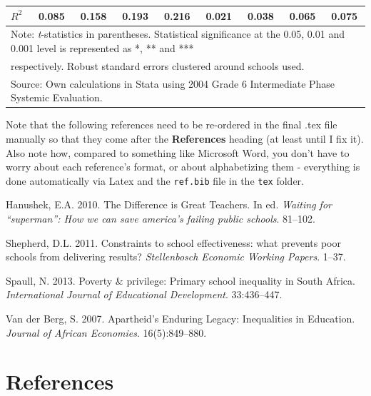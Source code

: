 \documentclass[12pt,preprint, authoryear]{article}
\numberwithin{equation}{section}
\numberwithin{figure}{section}
\numberwithin{table}{section}
\begin{document}
\begin{longtable}[htbp] {p{5cm}*{4}{c}|*{4}{c}}
\(R^{2}\)       &    0.085         &    0.158         &    0.193         &    0.216         &    0.021         &    0.038         &    0.065         &    0.075         \\
\hline\hline
\multicolumn{9}{l}{Note: \textit{t}-statistics in parentheses. Statistical significance at the 0.05, 0.01 and 0.001 level is represented as *, ** and ***} \\
\multicolumn{9}{l}{ respectively. Robust standard errors clustered around schools used.}\\
\multicolumn{9}{l}{Source: Own calculations in Stata using 2004 Grade 6 Intermediate Phase Systemic Evaluation.}\\
\end{longtable}

\normalsize

\newpage

\color{red}Note that the following references need to be re-ordered in
the final .tex file manually so that they come after the
\textbf{References} heading (at least until I fix it). Also note how,
compared to something like Microsoft Word, you don't have to worry about
each reference's format, or about alphabetizing them - everything is
done automatically via Latex and the \texttt{ref.bib} file in the
\texttt{tex} folder. \color{black}

\hypertarget{refs}{}
\hypertarget{ref-Hanushek2010}{}
Hanushek, E.A. 2010. The Difference is Great Teachers. In ed.
\emph{Waiting for ``superman'': How we can save america's failing public
schools}. 81--102.

\hypertarget{ref-Shepherd2011}{}
Shepherd, D.L. 2011. Constraints to school effectiveness: what prevents
poor schools from delivering results? \emph{Stellenbosch Economic
Working Papers}. 1--37.

\hypertarget{ref-Spaull2013}{}
Spaull, N. 2013. Poverty \& privilege: Primary school inequality in
South Africa. \emph{International Journal of Educational Development}.
33:436--447.

\hypertarget{ref-vanderBerg2007}{}
Van der Berg, S. 2007. Apartheid's Enduring Legacy: Inequalities in
Education. \emph{Journal of African Economies}. 16(5):849--880.

\newcommand\wordcount{
    \immediate\write18{texcount -sub=section \jobname.tex  | grep "Section" |     sed -e 's/+.*//' | sed -n \thesection p > 'count.txt'}
(words)}

\section*{References}
\end{document}
